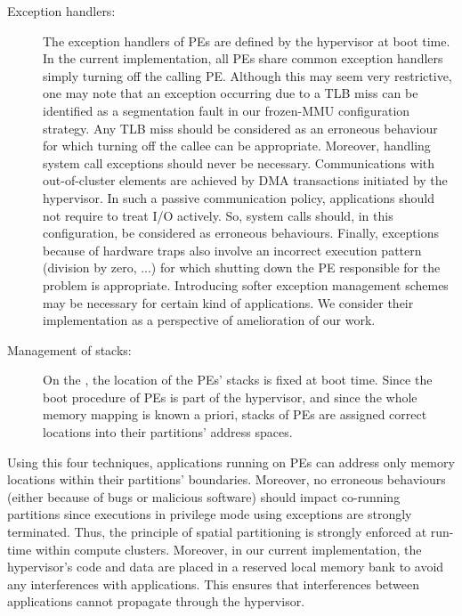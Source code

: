 \documentclass[main.tex]{subfiles}
\begin{document}
\begin{description}
    \item[Exception handlers: ] The exception handlers of PEs are defined by the hypervisor at boot time. In the current implementation, all PEs share common exception handlers simply turning off the calling PE. Although this may seem very restrictive, one may note that an exception occurring due to a TLB miss can be identified as a segmentation fault in our frozen-MMU configuration strategy. Any TLB miss should be considered as an erroneous behaviour for which turning off the callee can be appropriate. Moreover, handling system call exceptions should never be necessary. Communications with out-of-cluster elements are achieved by DMA transactions initiated by the hypervisor. In such a passive communication policy, applications should not require to treat I/O actively. So, system calls should, in this configuration, be considered as erroneous behaviours. Finally, exceptions because of hardware traps also involve an incorrect execution pattern (division by zero, ...) for which shutting down the PE responsible for the problem is appropriate. Introducing softer exception management schemes may be necessary for certain kind of applications. We consider their implementation as a perspective of amelioration of our work.
    \item[Management of stacks: ] On the \mppalong, the location of the PEs' stacks is fixed at boot time. Since the boot procedure of PEs is part of the hypervisor, and since the whole memory mapping is known a priori, stacks of PEs are assigned correct locations into their partitions' address spaces.
\end{description}

Using this four techniques, applications running on PEs can address only memory locations within their partitions' boundaries. Moreover, no erroneous behaviours (either because of bugs or malicious software) should impact co-running partitions since executions in privilege mode using exceptions are strongly terminated. Thus, the principle of spatial partitioning is strongly enforced at run-time within compute clusters. Moreover, in our current implementation, the hypervisor's code and data are placed in a reserved local memory bank to avoid any interferences with applications. This ensures that interferences between applications cannot propagate through the hypervisor. 
\end{document}
